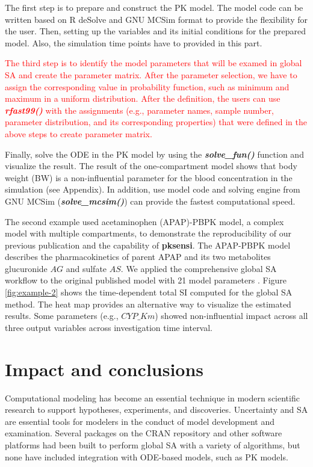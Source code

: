 \documentclass[preprint,12pt, a4paper]{elsarticle}
\begin{document}
The first step is to prepare and construct the PK model. The model code can be written based on R deSolve and GNU MCSim format to provide the flexibility for the user. Then, setting up the variables and its initial conditions for the prepared model. Also, the simulation time points have to provided in this part.

\textcolor{red}{The third step is to identify the model parameters that will be examed in global SA and create the parameter matrix. After the parameter selection, we have to assign the corresponding value in probability function, such as minimum and maximum in a uniform distribution. After the definition, the users can use \textit{\textbf{rfast99()}} with the assignments (e.g., parameter names, sample number, parameter distribution, and its corresponding properties) that were defined in the above steps to create parameter matrix.}

Finally, solve the ODE in the PK model by using the \textit{\textbf{solve\_fun()}} function and visualize the result. The result of the one-compartment model shows that body weight (BW) is a non-influential parameter for the blood concentration in the simulation (see Appendix). In addition, use model code and solving engine from GNU MCSim (\textit{\textbf{solve\_mcsim()}}) can provide the fastest computational speed.

The second example used acetaminophen (APAP)-PBPK model, 
a complex model with multiple compartments, to demonstrate the reproducibility of our previous publication \cite{fphar201800588} and the capability of \textbf{pksensi}. 
The APAP-PBPK model describes the pharmacokinetics of parent APAP and its two metabolites glucuronide \(AG\) and sulfate \(AS\). 
We applied the comprehensive global SA workflow to the original published model with 21 model parameters \cite{s13318-015-0253-x}. 
Figure \ref{fig:example-2} shows the time-dependent total SI computed for the global SA method. The heat map provides an alternative way to visualize the estimated results. Some parameters (e.g., \(CYP\_Km\)) showed non-influential impact across all three output variables across investigation time interval.

\section{Impact and conclusions}

Computational modeling has become an essential technique in modern 
scientific research to support hypotheses, experiments, and discoveries. 
Uncertainty and SA are essential tools for modelers in the conduct of model 
development and examination. 
Several packages on the CRAN repository and other software platforms had been
built to perform global SA with a variety of algorithms, but none have included 
integration with ODE-based models, such as PK models. 
\end{document}
